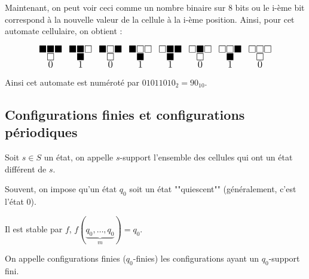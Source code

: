 \begin{notation}
	Maintenant, on peut voir ceci comme un nombre binaire sur 8 bits ou le i-ème bit correspond à la
	nouvelle valeur de la cellule à la i-ème position. Ainsi, pour cet automate cellulaire, on obtient :


	\[ \LARGE
		\substack{\blacksquare \blacksquare \blacksquare \\ \square \\ 0 } \enspace
		\substack{\blacksquare \blacksquare \square \\ \blacksquare \\ 1} \enspace
		\substack{\blacksquare \square \blacksquare \\ \square \\ 0} \enspace
		\substack{\blacksquare \square \square \\ \blacksquare \\ 1} \enspace
		\substack{\square \blacksquare \blacksquare \\ \blacksquare \\ 1} \enspace
		\substack{\square \blacksquare \square \\ \square \\ 0} \enspace
		\substack{\square \square \blacksquare \\ \blacksquare \\ 1} \enspace
		\substack{\square \square \square \\ \square \\ 0}
	\]

	Ainsi cet automate est numéroté par $01011010_2 = 90_{10}$.
\end{notation}

\subsection{Configurations finies et configurations périodiques}

\begin{definition}
	Soit $s \in S$ un état, on appelle $s$-support l'ensemble des cellules qui ont
	un état différent de $s$.
\end{definition}

\begin{notation}
	Souvent, on impose qu'un état $q_0$ soit un état ""quiescent"" (généralement, c'est l'état 0).

	Il est stable par $f$, \ie $f(\underbrace{q_0,\ldots, q_0}_m) = q_0$.
\end{notation}

\begin{definition}
	On appelle configurations finies ($q_0$-finies) les configurations ayant un $q_0$-support fini.
\end{definition}

